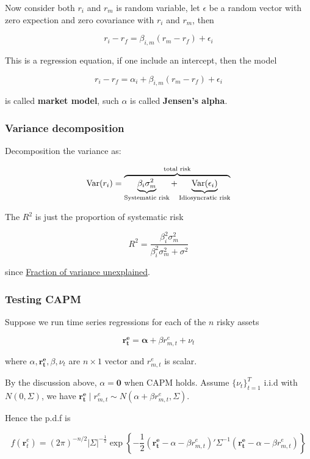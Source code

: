 \documentclass{article}
\begin{document}
Now consider both \(r_i\) and \(r_m\) is random variable, let
\(\epsilon\) be a random vector with zero expection and zero covariance
with \(r_i\) and \(r_m\), then

\[ 
r_i-r_f=\beta_{i,m}(r_m-r_f)+\epsilon_i
\]

This is a regression equation, if one include an intercept, then the
model

\[ 
r_i-r_f=\alpha_i+\beta_{i,m}(r_m-r_f)+\epsilon_i
\]

is called \textbf{market model}, such \(\alpha\) is called
\textbf{Jensen's alpha}.

\hypertarget{variance-decomposition}{%
\subsubsection{Variance decomposition}\label{variance-decomposition}}

Decomposition the variance as:

\[ \operatorname{Var}(r_i)=\overbrace{\underbrace{\beta_i\sigma_m^2}_{\text{Systematic risk}}+\underbrace{\operatorname{Var}(\epsilon_i)}_{\text{Idiosyncratic risk}}}^{\text{total risk}} \]

The \(R^2\) is just the proportion of systematic risk

\[ R^2=\frac{\beta_i^2\sigma_m^2}{\beta_i^2\sigma_m^2+\sigma^2} \]

since
\href{https://en.wikipedia.org/wiki/Fraction_of_variance_unexplained}{Fraction
of variance unexplained}.

\hypertarget{testing-capm}{%
\subsubsection{Testing CAPM}\label{testing-capm}}

Suppose we run time series regressions for each of the \(n\) risky
assets

\[ \mathbf{r_t^e=\alpha}+{\beta r_{m,t}^e+\nu_t} \]

where \(\alpha,\mathbf{r_t^e},\beta,\nu_t\) are \(n\times 1\) vector and
\(r_{m,t}^e\) is scalar.

By the discussion above, \(\alpha=\mathbf{0}\) when CAPM holds. Assume
\(\{\nu_t\}_{t=1}^T\) i.i.d with \(N(0,\Sigma)\), we have
\(\mathbf{r_t^e}\mid r_{m,t}^e\sim N(\alpha+\beta r_{m,t}^e,\Sigma)\).

Hence the p.d.f is

\[f(\mathbf{r}_t^e)= ( 2 \pi ) ^ { - n / 2 } | \Sigma | ^ { - \frac { 1 } { 2 } } \exp \left\{ - \frac { 1 } { 2 } ( \mathbf { r_t^e } - \alpha-\beta r_{m,t}^e)' \Sigma ^ { - 1 } ( \mathbf { r_t^e } - \alpha-\beta r_{m,t}^e)  \right\} \]
\end{document}
